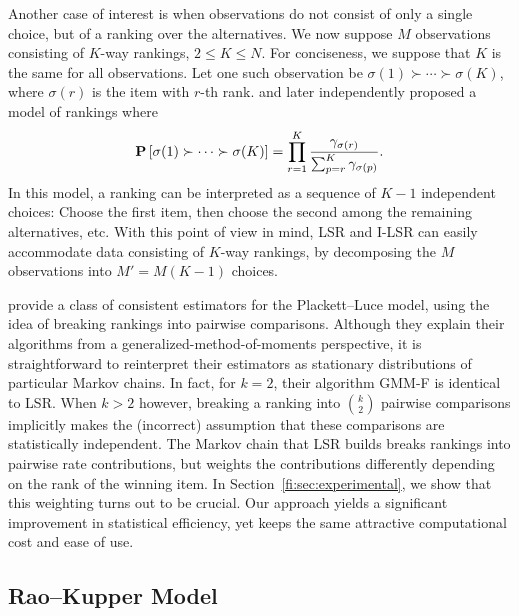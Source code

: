 Another case of interest is when observations do not consist of only a single choice, but of a ranking over the alternatives.
We now suppose $M$ observations consisting of $K$-way rankings, $2 \le K \le N$.
For conciseness, we suppose that $K$ is the same for all observations.
Let one such observation be $\sigma(1) \succ \cdots \succ \sigma(K)$, where $\sigma(r)$ is the item with $r$-th rank.
\citet{luce1959individual} and later \citet{plackett1975analysis} independently proposed a model of rankings where
\begin{align*}
\mathbf{P}\left[  \sigma(1) \succ \cdots \succ \sigma(K)  \right]
  = \prod_{r = 1}^{K} \frac{\gamma_{\sigma(r)}}{\sum_{p = r}^{K} \gamma_{\sigma(p)}}.
\end{align*}
In this model, a ranking can be interpreted as a sequence of $K-1$ independent choices:
Choose the first item, then choose the second among the remaining alternatives, etc.
With this point of view in mind, LSR and I-LSR can easily accommodate data consisting of $K$-way rankings, by decomposing the $M$ observations into $M' = M (K - 1)$ choices.

\citet{azari2013generalized} provide a class of consistent estimators for the Plackett--Luce model, using the idea of breaking rankings into pairwise comparisons.
Although they explain their algorithms from a generalized-method-of-moments perspective, it is straightforward to reinterpret their estimators as stationary distributions of particular Markov chains.
In fact, for $k = 2$, their algorithm GMM-F is identical to LSR.
When $k > 2$ however, breaking a ranking into $\binom{k}{2}$ pairwise comparisons implicitly makes the (incorrect) assumption that these comparisons are statistically independent.
The Markov chain that LSR builds breaks rankings into pairwise rate contributions, but weights the contributions differently depending on the rank of the winning item.
In Section~\ref{fi:sec:experimental}, we show that this weighting turns out to be crucial.
Our approach yields a significant improvement in statistical efficiency, yet keeps the same attractive computational cost and ease of use.


\subsection{Rao--Kupper Model}
\label{fi:sec:ties}

